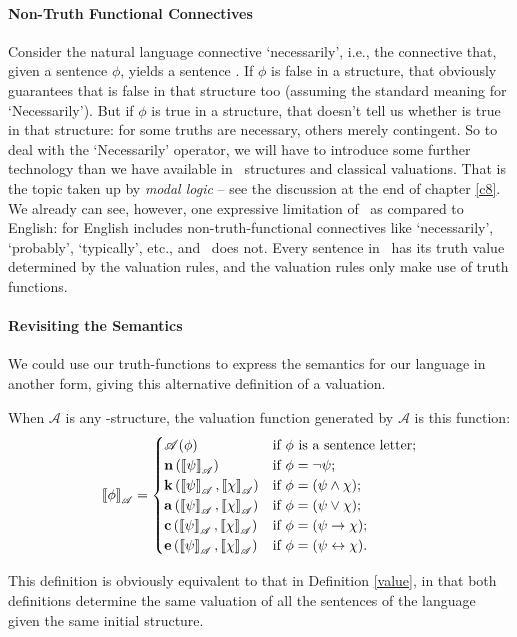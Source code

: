 \paragraph{Non-Truth Functional Connectives} Consider the natural language connective `necessarily', i.e., the connective that, given a sentence $\phi$, yields a sentence . If $\phi$ is false in a structure, that obviously guarantees that  is false in that structure too (assuming the standard meaning for ‘Necessarily’). But if $\phi$ is true in a structure, that doesn't tell us whether  is true in that structure: for some truths are necessary, others merely contingent. So to deal with the `Necessarily' operator, we will have to introduce some further technology than we have available in \lone\ structures and classical valuations. That is the topic taken up by \emph{modal logic} – see the discussion at the end of chapter \ref{c8}. We already can see, however, one expressive limitation of \lone\ as compared to English: for English includes non-truth-functional connectives like `necessarily', `probably', `typically', etc., and \lone\ does not. Every sentence in \lone\ has its truth value determined by the valuation rules, and the valuation rules only make use of truth functions.

\paragraph{Revisiting the Semantics} We could use our truth-functions to express the semantics for our language in another form, giving this alternative definition of a valuation. \begin{definition}
	When $\mathscr{A}$ is any \lone-structure, the valuation function generated by $\mathscr{A}$ is this function\label{val2}: $$\left\llbracket \phi\right\rrbracket_{\mathscr{A}} = \begin{cases}
		\mathscr{A}(\phi) &\text{if $\phi$ is a sentence letter};\\
		\mathbf{n}\left(\left\llbracket \psi\right\rrbracket_{\mathscr{A}}\right) &\text{if } \phi = \neg\psi;\\
		\mathbf{k}\left(\left\llbracket \psi\right\rrbracket_{\mathscr{A}},\left\llbracket \chi\right\rrbracket_{\mathscr{A}}\right) &\text{if } \phi = (\psi \wedge \chi);\\ 
		\mathbf{a}\left(\left\llbracket \psi\right\rrbracket_{\mathscr{A}},\left\llbracket \chi\right\rrbracket_{\mathscr{A}}\right) &\text{if } \phi = (\psi \vee \chi);\\
		\mathbf{c}\left(\left\llbracket \psi\right\rrbracket_{\mathscr{A}},\left\llbracket \chi\right\rrbracket_{\mathscr{A}}\right) &\text{if } \phi = (\psi \to \chi);\\
		\mathbf{e}\left(\left\llbracket \psi\right\rrbracket_{\mathscr{A}},\left\llbracket \chi\right\rrbracket_{\mathscr{A}}\right) &\text{if } \phi = (\psi \leftrightarrow \chi).\\ 
	\end{cases}$$
\end{definition} This definition is obviously equivalent to that in Definition \ref{value}, in that both definitions determine the same valuation of all the sentences of the language given the same initial structure.





